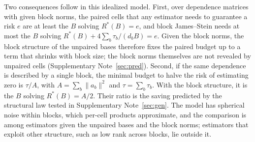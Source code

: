 Two consequences follow in this idealized model. First, over dependence matrices with given block norms, the paired cells that any estimator needs to guarantee a risk $e$ are at least the $B$ solving $R^*(B)=e$, and block James--Stein needs at most the $B$ solving $R^*(B)+4\sum_b\tau_b/(d_bB)=e$. Given the block norms, the block structure of the unpaired bases therefore fixes the paired budget up to a term that shrinks with block size; the block norms themselves are not revealed by unpaired cells (Supplementary Note~\ref{sec:pred}). Second, if the same dependence is described by a single block, the minimal budget to halve the risk of estimating zero is $\tau/A$, with $A=\sum_b\|a_b\|^2$ and $\tau=\sum_b\tau_b$. With the block structure, it is the $B$ solving $R^*(B)=A/2$. Their ratio is the saving predicted by the structural law tested in Supplementary Note~\ref{sec:gen}. The model has spherical noise within blocks, which per-cell products approximate, and the comparison is among estimators given the unpaired bases and the block norms; estimators that exploit other structure, such as low rank across blocks, lie outside it.

